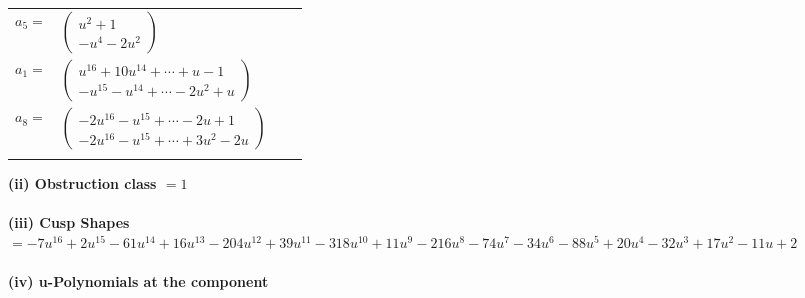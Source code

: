 \documentclass[1p]{elsarticle_modified}
\theoremstyle{definition}
\begin{document}
\begin{tabular}{m{7pt} m{180pt} m{7pt} m{180pt} }
\flushright $a_{5}=$&$\begin{pmatrix}u^2+1\\- u^4-2 u^2\end{pmatrix}$ \\
\flushright $a_{1}=$&$\begin{pmatrix}u^{16}+10 u^{14}+\cdots+u-1\\- u^{15}- u^{14}+\cdots-2 u^2+u\end{pmatrix}$ \\
\flushright $a_{8}=$&$\begin{pmatrix}-2 u^{16}- u^{15}+\cdots-2 u+1\\-2 u^{16}- u^{15}+\cdots+3 u^2-2 u\end{pmatrix}$\\&\end{tabular}
\flushleft \textbf{(ii) Obstruction class $= 1$}\\~\\
\flushleft \textbf{(iii) Cusp Shapes $= -7 u^{16}+2 u^{15}-61 u^{14}+16 u^{13}-204 u^{12}+39 u^{11}-318 u^{10}+11 u^9-216 u^8-74 u^7-34 u^6-88 u^5+20 u^4-32 u^3+17 u^2-11 u+2$}\\~\\
\newpage\renewcommand{\arraystretch}{1}
\flushleft \textbf{(iv) u-Polynomials at the component}\newline \\
\end{document}
